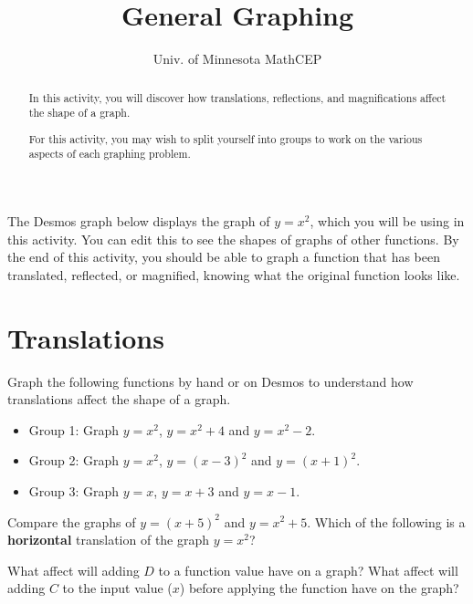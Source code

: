 \documentclass[number]{ximera}
\title{General Graphing}
\author{Univ. of Minnesota MathCEP}
\begin{document}
\begin{abstract}
In this activity, you will discover how translations, reflections, and magnifications affect the shape of a graph.

For this activity, you may wish to split yourself into groups to work on the various aspects of each graphing problem.
\end{abstract}

\maketitle

The Desmos graph below displays the graph of $y=x^2$, which you will be using in this activity.
You can edit this to see the shapes of graphs of other functions.
By the end of this activity, you should be able to graph a function that has been translated, reflected, or magnified, knowing what the original function looks like.


\section{Translations}
\begin{problem} Graph the following functions by hand or on Desmos to understand how translations affect the shape of a graph.

\begin{itemize}
\item Group 1: Graph $y = x^2$, $y = x^2 + 4$ and $y = x^2 - 2$.
\item Group 2: Graph $y = x^2$, $y = (x-3)^2$ and $y = (x+1)^2$.
\item Group 3: Graph $y = x$, $y = x+3$ and $y=x-1$.
\end{itemize}
\end{problem}

\begin{question}
Compare the graphs of $y=(x+5)^2$ and $y=x^2+5$. Which of the following is a {\bf horizontal} translation of the graph $y=x^2$?
\begin{multipleChoice}
\end{multipleChoice}
\end{question}


\begin{question}
What affect will adding $D$ to a function value have on a graph? What affect will adding $C$ to the input value ($x$) before applying the function have on the graph?
\begin{freeResponse}\end{freeResponse}
\end{question}
\end{document}
